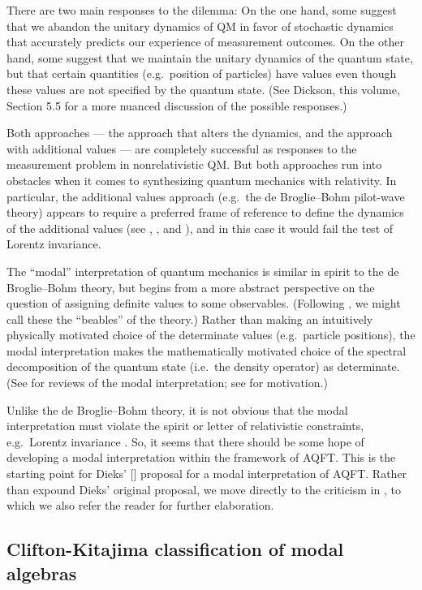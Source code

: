 \documentclass[12pt]{article}
\theoremstyle{definition}
\theoremstyle{definition}
\theoremstyle{remark}
\begin{document}
There are two main responses to the dilemma: On the one hand, some
suggest that we abandon the unitary dynamics of QM in favor of
stochastic dynamics that accurately predicts our experience of
measurement outcomes.  On the other hand, some suggest that we
maintain the unitary dynamics of the quantum state, but that certain
quantities (e.g.\ position of particles) have values even though these
values are not specified by the quantum state.  (See Dickson, this
volume, Section 5.5 for a more nuanced discussion of the possible
responses.)

Both approaches --- the approach that alters the dynamics, and the
approach with additional values --- are completely successful as
responses to the measurement problem in nonrelativistic QM.  But both
approaches run into obstacles when it comes to synthesizing quantum
mechanics with relativity.  In particular, the additional values
approach (e.g.\ the de Broglie--Bohm pilot-wave theory) appears to
require a preferred frame of reference to define the dynamics of the
additional values (see \cite[pp.\ 188--191, 196--198]{cush},
\cite{holland}, and \cite[Chaps.\ 11 \& 12]{hiley}), and in this case
it would fail the test of Lorentz invariance.

The ``modal'' interpretation of quantum mechanics is
similar in spirit to the de Broglie--Bohm theory, but
begins from a more abstract perspective on the question
of assigning definite values to some observables.
(Following \cite{jbell}, we might call these the
``beables'' of the theory.)  Rather than making an
intuitively physically motivated choice of the
determinate values (e.g.\ particle positions), the
modal interpretation makes the mathematically motivated
choice of the spectral decomposition of the quantum
state (i.e.\ the density operator) as determinate.
(See \cite{ver,piet} for reviews of the modal
interpretation; see \cite{rob-kd} for motivation.)

Unlike the de Broglie--Bohm theory, it is not obvious
that the modal interpretation must violate the spirit
or letter of relativistic constraints, e.g.\ Lorentz
invariance \cite[p.\ 9]{dic}.  So, it seems that there
should be some hope of developing a modal
interpretation within the framework of AQFT.  This is
the starting point for Dieks' [\citeyear{diek}]
proposal for a modal interpretation of AQFT.  Rather
than expound Dieks' original proposal, we move directly
to the criticism in \cite{cli9}, to which we also refer
the reader for further elaboration.

\subsection{Clifton-Kitajima classification of modal algebras}
\end{document}
